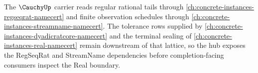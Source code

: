 The $\CauchyUp$ carrier reads regular rational tails through \autoref{ch:concrete-instances-regseqrat-namecert} and finite observation schedules through \autoref{ch:concrete-instances-streamname-namecert}. The tolerance rows supplied by \autoref{ch:concrete-instances-dyadicratcore-namecert} and the terminal sealing of \autoref{ch:concrete-instances-real-namecert} remain downstream of that lattice, so the hub exposes the RegSeqRat and StreamName dependencies before completion-facing consumers inspect the Real boundary.
